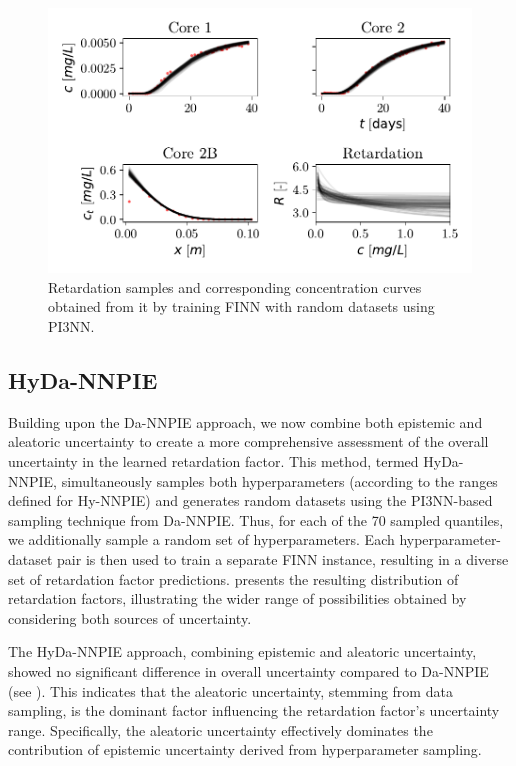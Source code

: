 \begin{figure}[h]
    \centering
    \includegraphics{figs/finn_dataspan_samples.pdf}
    \caption{Retardation samples and corresponding concentration curves obtained from it by training FINN with random datasets using PI3NN.}
    \label{fig:dataspan_samples}
\end{figure}



\subsection{HyDa-NNPIE}
Building upon the Da-NNPIE approach, we now combine both epistemic and aleatoric uncertainty to create a more comprehensive assessment of the overall uncertainty in the learned retardation factor. This method, termed HyDa-NNPIE, simultaneously samples both hyperparameters (according to the ranges defined for Hy-NNPIE) and generates random datasets using the PI3NN-based sampling technique from Da-NNPIE. Thus, for each of the 70 sampled quantiles, we additionally sample a random set of hyperparameters. Each hyperparameter-dataset pair is then used to train a separate FINN instance, resulting in a diverse set of retardation factor predictions.  presents the resulting distribution of retardation factors, illustrating the wider range of possibilities obtained by considering both sources of uncertainty.

The HyDa-NNPIE approach, combining epistemic and aleatoric uncertainty, showed no significant difference in overall uncertainty compared to Da-NNPIE (see ). This indicates that the aleatoric uncertainty, stemming from data sampling, is the dominant factor influencing the retardation factor's uncertainty range. Specifically, the aleatoric uncertainty effectively dominates the contribution of epistemic uncertainty derived from hyperparameter sampling.

